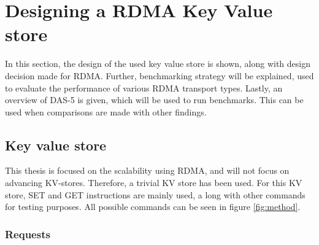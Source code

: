 
\chapter{Designing a RDMA Key Value store}\label{ch:design} %



\ifpdf
    \graphicspath{{7/figures/PNG/}{7/figures/PDF/}{7/figures/}}
\else
    \graphicspath{{7/figures/EPS/}{7/figures/}}
\fi


In this section, the design of the used key value store is shown, along with design decision made for RDMA.
Further, benchmarking strategy will be explained, used to evaluate the performance of various RDMA transport types.
Lastly, an overview of DAS-5 is given, which will be used to run benchmarks.
This can be used when comparisons are made with other findings.

\section{Key value store}
This thesis is focused on the scalability using RDMA, and will not focus on advancing KV-stores.
Therefore, a trivial KV store has been used.
For this KV store, SET and GET instructions are mainly used, a long with other commands for testing purposes.
All possible commands can be seen in figure \ref{fig:method}.

\subsection{Requests}

